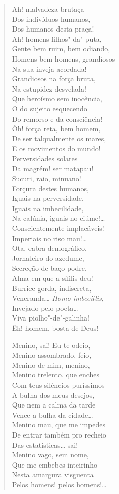 {\begin{verse}
Ah! malvadeza brutaça\\
Dos indivíduos humanos,\\
Dos humanos desta praça!\\
Ah! homens filhos"-da"-puta,\\
Gente bem ruim, bem odiando,\\
Homens bem homens, grandiosos\\
Na sua inveja acordada!\\
Grandiosos na força bruta,\\
Na estupidez desvelada!\\
Que heroísmo sem inocência,\\
O do sujeito esquecendo\\
Do remorso e da consciência!\\
Ôh! força reta, bem homem,\\
De ser talqualmente os mares,\\
E os movimentos do mundo!\\
Perversidades solares\\
Da magrém! ser matapau!\\
Sucuri, raio, minuano!\\
Forçura destes humanos,\\
Iguais na perversidade,\\
Iguais na imbecilidade,\\
Na calúnia, iguais no ciúme!\ldots{}\\
Conscientemente implacáveis!\\
Imperiais no riso mau!\ldots{}\\
Ota, cabra demográfico,\\
Jornaleiro do azedume,\\
Secreção de baço podre,\\
Alma em que a sífilis deu!\\
Burrice gorda, indiscreta,\\
Veneranda\ldots{} \emph{Homo imbecillis},\\
Invejado pelo poeta\ldots{}\\
Viva piolho"-de"-galinha!\\
Êh! homem, bosta de Deus!

Menino, sai! Eu te odeio,\\
Menino assombrado, feio,\\
Menino de mim, menino,\\
Menino trelento, que enches\\
Com teus silêncios puríssimos\\
A bulha dos meus desejos,\\
Que nem a calma da tarde\\
Vence a bulha da cidade\ldots{}\\
Menino mau, que me impedes\\
De entrar também pro recheio\\
Das estatísticas\ldots{} sai!\\
Menino vago, sem nome,\\
Que me embebes inteirinho\\
Nesta amargura visguenta\\
Pelos homens! pelos homens!\ldots{}


\end{verse}}
